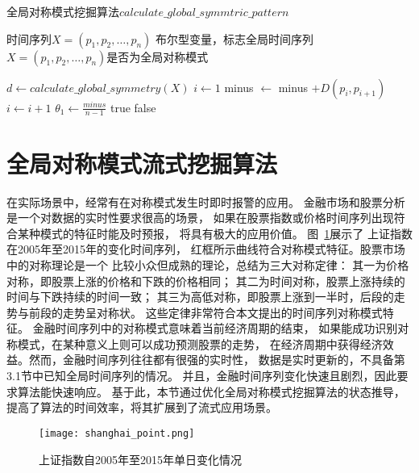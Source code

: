 \renewcommand{\algorithmicrequire}{\textbf{输入：}\unskip}
\renewcommand{\algorithmicensure}{\textbf{输出：}\unskip}
\begin{algorithm}
  \caption{全局对称模式挖掘算法$calculate\_global\_symmtric\_pattern$}
  \label{alg:global_symmetric}
  \small
  \begin{algorithmic}
    \REQUIRE 时间序列$X=\left(p_{1}, p_{2}, \dots, p_{n}\right)$
    \ENSURE 布尔型变量，标志全局时间序列$X=\left(p_{1},p_{2},\dots,p_n \right)$是否为全局对称模式

    \STATE $d \leftarrow calculate\_global\_symmetry(X) $
    \STATE $i \leftarrow 1$
    \STATE minus $\leftarrow$ minus $+D\left(p_{i}, p_{i+1}\right)$
    \STATE $i \leftarrow i+1$
    \ENDWHILE
    \STATE $\theta_1 \leftarrow \frac{minus}{n-1}$
      \RETURN true
    \ELSE
      \RETURN false
    \ENDIF
  \end{algorithmic}
\end{algorithm}


\section{全局对称模式流式挖掘算法}
在实际场景中，经常有在对称模式发生时即时报警的应用\cite{2022968}。
金融市场和股票分析是一个对数据的实时性要求很高的场景，
如果在股票指数或价格时间序列出现符合某种模式的特征时能及时预报，
将具有极大的应用价值\cite{DBLP:journals/jucs/BeheraDRMD20}。
图~\ref{fig:shanghai_point}展示了
上证指数在2005年至2015年的变化时间序列，
红框所示曲线符合对称模式特征。股票市场中的对称理论是一个
比较小众但成熟的理论，总结为三大对称定律：
其一为价格对称，即股票上涨的价格和下跌的价格相同；
其二为时间对称，股票上涨持续的时间与下跌持续的时间一致；
其三为高低对称，即股票上涨到一半时，后段的走势与前段的走势呈对称状。
这些定律非常符合本文提出的时间序列对称模式特征。
金融时间序列中的对称模式意味着当前经济周期的结束，
如果能成功识别对称模式，在某种意义上则可以成功预测股票的走势，
在经济周期中获得经济效益。然而，金融时间序列往往都有很强的实时性，
数据是实时更新的，不具备第3.1节中已知全局时间序列的情况。
并且，金融时间序列变化快速且剧烈，因此要求算法能快速响应。
基于此，本节通过优化全局对称模式挖掘算法的状态推导，
提高了算法的时间效率，将其扩展到了流式应用场景。
\begin{figure}
  \centering
  \texttt{[image: shanghai\_point.png]}
  \caption{上证指数自2005年至2015年单日变化情况}
  \label{fig:shanghai_point}
\end{figure}

